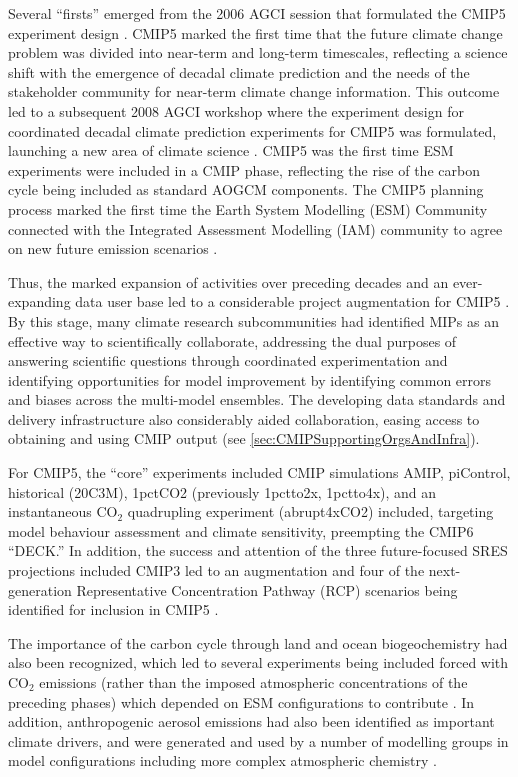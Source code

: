 \documentclass[manuscript]{copernicus}
\begin{document}
Several ``firsts'' emerged from the 2006 AGCI session that formulated the CMIP5 experiment design \citep{hibbard_strategy_2007}. CMIP5 marked the first time that the future climate change problem was divided into near-term and long-term timescales, reflecting a science shift with the emergence of decadal climate prediction and the needs of the stakeholder community for near-term climate change information. This outcome led to a subsequent 2008 AGCI workshop where the experiment design for coordinated decadal climate prediction experiments for CMIP5 was formulated, launching a new area of climate science \citep{meehl_decadal_2009}. CMIP5 was the first time ESM experiments were included in a CMIP phase, reflecting the rise of the carbon cycle being included as standard AOGCM components. The CMIP5 planning process marked the first time the Earth System Modelling (ESM) Community connected with the Integrated Assessment Modelling (IAM) community to agree on new future emission scenarios \citep{moss_towards_2008}.

Thus, the marked expansion of activities over preceding decades and an ever-expanding data user base led to a considerable project augmentation for CMIP5 \citep{meehl_introduction_2011}. By this stage, many climate research subcommunities had identified MIPs as an effective way to scientifically collaborate, addressing the dual purposes of answering scientific questions through coordinated experimentation and identifying opportunities for model improvement by identifying common errors and biases across the multi-model ensembles. The developing data standards and delivery infrastructure also considerably aided collaboration, easing access to obtaining and using CMIP output (see \autoref{sec:CMIPSupportingOrgsAndInfra}).

For CMIP5, the ``core'' experiments included CMIP simulations AMIP, piControl, historical (20C3M), 1pctCO2 (previously 1pctto2x, 1pctto4x), and an instantaneous CO$_{2}$ quadrupling experiment (abrupt4xCO2) included, targeting model behaviour assessment and climate sensitivity, preempting the CMIP6 ``DECK.'' In addition, the success and attention of the three future-focused SRES projections included CMIP3 led to an augmentation and four of the next-generation Representative Concentration Pathway (RCP) scenarios being identified for inclusion in CMIP5 \citep{moss_next_2010}.

The importance of the carbon cycle through land and ocean biogeochemistry had also been recognized, which led to several experiments being included forced with CO$_{2}$ emissions (rather than the imposed atmospheric concentrations of the preceding phases) which depended on ESM configurations to contribute \citep{hibbard_strategy_2007,meehl_introduction_2011}. In addition, anthropogenic aerosol emissions had also been identified as important climate drivers, and were generated and used by a number of modelling groups in model configurations including more complex atmospheric chemistry \citep[e.g.,][]{lamarque_historical_2010}.
\end{document}
